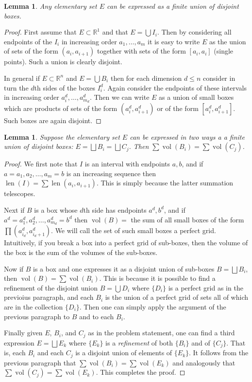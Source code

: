 \documentclass[11pt,oneside]{amsbook}
\newcommand{\RR}{{\mathbb R}}
\DeclareMathOperator{\len}{len}
\DeclareMathOperator{\vol}{vol}
\theoremstyle{definition}
\theoremstyle{plain}
\newtheorem{lem}[thm]{Lemma}
\theoremstyle{definition}
\theoremstyle{remark}
\numberwithin{equation}{section}
\numberwithin{figure}{section}
\begin{document}
\begin{lem}
  Any elementary set $E$ can be expressed as a finite union of disjoint boxes.
\end{lem}

\begin{proof}
  First assume that $E\subset\RR^1$ and that $E=\bigcup I_i$. Then by considering all endpoints of the $I_i$ in increasing order $a_1,\ldots,a_m$ it is easy to write $E$ as the union of sets of the form $(a_i,a_{i+1})$ together with sets of the form $[a_i,a_i]$ (single points). Such a union is clearly disjoint.

  In general if $E\subset\RR^n$ and $E=\bigcup B_i$ then for each dimension $d\leq n$ consider in turn the $d$th sides of the boxes $I_i^d$. Again consider the endpoints of these intervals in increasing order $a_i^d,\ldots,a_{m_d}^d$. Then we can write $E$ as a union of small boxes which are products of sets of the form $(a_i^d,a_{i+1}^d)$ or of the form $[a_i^d,a_{i+1}^d]$. Such boxes are again disjoint.
\end{proof}

\begin{lem}
  Suppose the elementary set $E$ can be expressed in two ways a a finite union of disjoint boxes: $E=\bigsqcup B_i=\bigsqcup C_j$. Then $\sum\vol(B_i)=\sum\vol(C_j)$.
\end{lem}

\begin{proof}
  We first note that $I$ is an interval with endpoints $a,b$, and if $a=a_1,a_2,\ldots,a_m=b$ is an increasing sequence then $\len(I)=\sum\len(a_i,a_{i+1})$. This is simply because the latter summation telescopes.
  
  Next if $B$ is a box whose $d$th side has endpoints $a^d,b^d$, and if $a^d=a_1^d,a_2^d,\ldots,a_{m_d}^d=b^d$ then $\vol(B)=$ the sum of all small boxes of the form $\prod(a_{i_d}^d,a_{i_d+1}^d)$. We will call the set of such small boxes a perfect grid. Intuitively, if you break a box into a perfect grid of sub-boxes, then the volume of the box is the sum of the volumes of the sub-boxes.

  Now if $B$ is a box and one expresses it as a disjoint union of sub-boxes $B=\bigsqcup B_i$, then $\vol(B)=\sum\vol(B_i)$. This is because it is possible to find a refinement of the disjoint union $B=\bigcup D_i$ where $\{D_i\}$ is a perfect grid as in the previoius paragraph, and each $B_i$ is the union of a perfect grid of sets all of which are in the collection $\{D_i\}$. Then one can simply apply the argument of the previous paragraph to $B$ and to each $B_i$.

  Finally given $E$, $B_i$, and $C_j$ as in the problem statement, one can find a third expression $E=\bigsqcup E_k$ where $\{E_k\}$ is a \emph{refinement} of both $\{B_i\}$ and of $\{C_j\}$. That is, each $B_i$ and each $C_j$ is a disjoint union of elements of $\{E_k\}$. It follows from the previous paragraph that $\sum\vol(B_i)=\sum\vol(E_k)$ and analogously that $\sum\vol(C_j)=\sum\vol(E_k)$. This completes the proof.
\end{proof}
\end{document}
